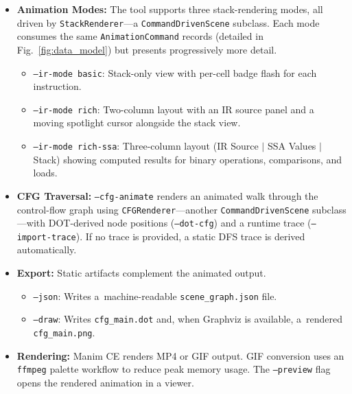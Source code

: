 \begin{itemize}
    \item \textbf{Animation Modes:} The tool supports three stack-rendering modes, all driven by \texttt{StackRenderer}---a \texttt{CommandDrivenScene} subclass. Each mode consumes the same \texttt{AnimationCommand} records (detailed in Fig.~\ref{fig:data_model}) but presents progressively more detail.
    \begin{itemize}
        \item \texttt{--ir-mode basic}: Stack-only view with per-cell badge flash for each instruction.
        \item \texttt{--ir-mode rich}: Two-column layout with an IR source panel and a moving spotlight cursor alongside the stack view.
        \item \texttt{--ir-mode rich-ssa}: Three-column layout (IR Source $\mid$ SSA Values $\mid$ Stack) showing computed results for binary operations, comparisons, and loads.
    \end{itemize}

    \item \textbf{CFG Traversal:} \texttt{--cfg-animate} renders an animated walk through the control-flow graph using \texttt{CFGRenderer}---another \texttt{CommandDrivenScene} subclass---with DOT-derived node positions (\texttt{--dot-cfg}) and a runtime trace (\texttt{--import-trace}). If no trace is provided, a static DFS trace is derived automatically.

    \item \textbf{Export:} Static artifacts complement the animated output.
    \begin{itemize}
        \item \texttt{--json}: Writes a~machine-readable \texttt{scene\_graph.json} file.
        \item \texttt{--draw}: Writes \texttt{cfg\_main.dot} and, when Graphviz is available, a~rendered \texttt{cfg\_main.png}.
    \end{itemize}

    \item \textbf{Rendering:} Manim CE renders MP4 or GIF output. GIF conversion uses an \texttt{ffmpeg} palette workflow to reduce peak memory usage. The \texttt{--preview} flag opens the rendered animation in a viewer.
\end{itemize}
